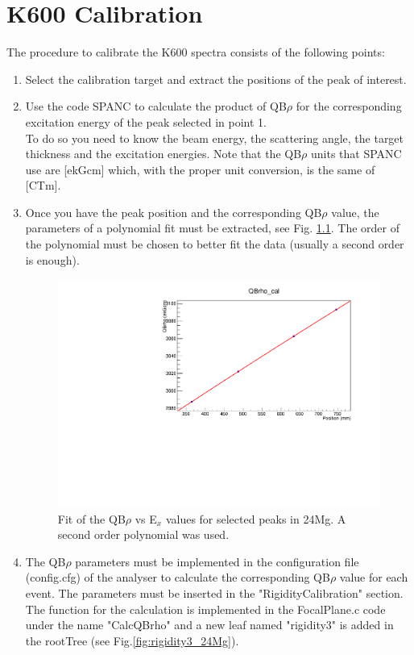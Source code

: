 \documentclass[]{report}
\begin{document}
\chapter{K600 Calibration}
The procedure to calibrate the K600 spectra consists of the following points:
\begin{enumerate}
	\item Select the calibration target and extract the positions of the peak of interest.
	\item Use the code SPANC to calculate the product of QB$\rho$ for the corresponding excitation energy of the peak selected in point 1. \\To do so you need to know the beam energy, the scattering angle, the target thickness and the excitation energies. Note that the QB$\rho$ units that SPANC use are [ekGcm] which, with the proper unit conversion, is the same of [CTm]. 
	\item Once you have the peak position and the corresponding QB$\rho$ value, the parameters of a polynomial fit must be extracted, see Fig. \ref{fig:ExvsQBrho_fit}. The order of the polynomial must be chosen to better fit the data (usually a second order is enough).
	
	\begin{figure}
		\includegraphics[width=\linewidth]{Figure/QBrho_24Mgcalib.pdf}
		\caption{Fit of the QB$\rho$ vs E$_x$ values for selected peaks in 24Mg. A second order polynomial was used.}
		\label{fig:ExvsQBrho_fit}
	\end{figure}
	
	\item The QB$\rho$ parameters must be implemented in the configuration file (config.cfg) of the analyser to calculate the corresponding QB$\rho$ value for each event. The parameters must be inserted in the "RigidityCalibration" section. The function for the calculation is implemented in the FocalPlane.c code under the name "CalcQBrho" and a new leaf named "rigidity3" is added in the rootTree (see Fig.\ref{fig:rigidity3_24Mg}).
	

\end{enumerate}
\end{document}
